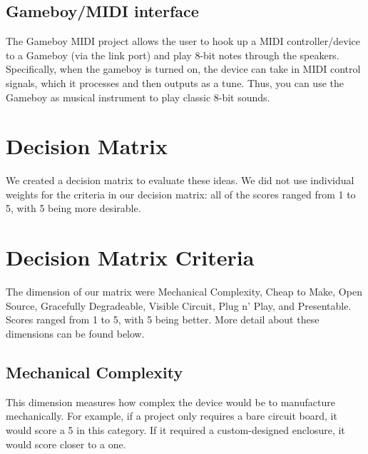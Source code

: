 \documentclass{article}
\begin{document}
\subsection{Gameboy/MIDI interface}

The Gameboy MIDI project allows the user to hook up a MIDI
controller/device to a Gameboy (via the link port) and play 8-bit
notes through the speakers. Specifically, when the gameboy is turned
on, the device can take in MIDI control signals, which it processes
and then outputs as a tune. Thus, you can use the Gameboy as musical
instrument to play classic 8-bit sounds.

\newpage

\section{Decision Matrix}
We created a decision matrix to evaluate these ideas. We did not use
individual weights for the criteria in our decision matrix: all of the
scores ranged from 1 to 5, with 5 being more desirable.


\section{Decision Matrix Criteria}
The dimension of
our matrix were Mechanical Complexity, Cheap to Make, Open Source,
Gracefully Degradeable, Visible Circuit, Plug n' Play, and
Presentable. Scores ranged from 1 to 5, with 5 being better. More
detail about these dimensions can be found below.
\subsection {Mechanical Complexity}
This dimension measures how complex the device would be to manufacture
mechanically. For example, if a project only requires a bare circuit
board, it would score a 5 in this category. If it required a
custom-designed enclosure, it would score closer to a one. 
\end{document}
